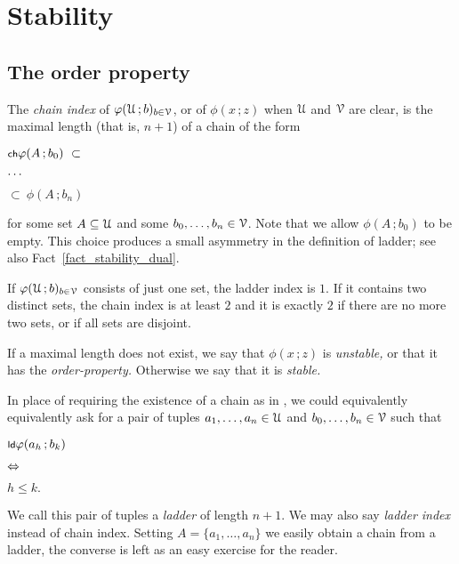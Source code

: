 \documentclass[scombinatorics.tex]{subfiles}
\begin{document}
\chapter{Stability}
\label{sauer}



\def\medrel#1{\parbox[t]{5ex}{$\displaystyle\hfil #1$}}
\def\ceq#1#2#3{\parbox[t]{20ex}{$\displaystyle #1$}\medrel{#2}{$\displaystyle #3$}}


\section{The order property}\label{ladder}

The \emph{chain index\/} of $\varphi(\EuScript U\,;b)_{b\in\EuScript V}$, or of $\phi(x\,;z)$ when $\EuScript U$ and $\EuScript V$ are clear, is the maximal length (that is, $n+1$) of a chain of the form

\ceq{\ssf{ch}\hfill\phi(A\,;b_0)\ \subset}{\dots}{\subset\ \phi(A\,;b_n)}

for some set $A\subseteq\EuScript U$ and some $b_0,\dots,b_n\in\EuScript V$.
Note that we allow $\phi(A\,;b_0)$ to be empty.
This choice produces a small asymmetry in the definition of ladder; see also Fact~\ref{fact_stability_dual}.


\begin{example}
  If $\varphi(\EuScript U\,;b)_{b\in\EuScript V}$ consists of just one set, the ladder index is $1$.
  If it contains two distinct sets, the  chain index is at least $2$ and it is exactly $2$ if there are no more two sets, or if all sets are disjoint.\QED
\end{example}

If a maximal length does not exist, we say that $\phi(x\,;z)$ is \emph{unstable,} or that it has the \emph{order-property.} 
Otherwise we say that it is \emph{stable.}

In place of requiring the existence of a chain as in , we could equivalently equivalently ask for a pair of tuples $a_1,\dots,a_n\in\EuScript U$ and $b_0,\dots,b_n\in\EuScript V$ such that

\ceq{\ssf{ld}\hfill\phi(a_h\,;b_k)}
{\IFF}
{h\le k.}

We call this pair of tuples a \emph{ladder\/} of length $n+1$.
We may also say \emph{ladder index\/} instead of chain index.
Setting $A=\{a_1,\dots,a_n\}$ we easily obtain a chain from a ladder, the converse is left as an easy exercise for the reader.
\end{document}
